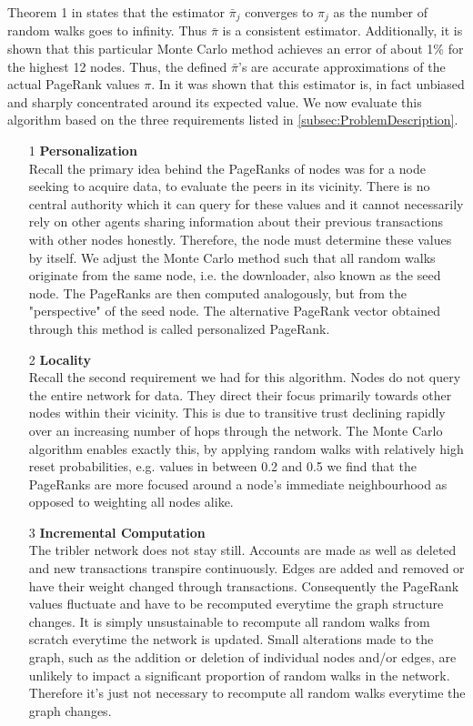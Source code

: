 \documentclass[sigconf]{acmart}
\theoremstyle{definition}
\begin{document}
\noindent Theorem 1 in \citep{Monte Carlo methods in PageRank computation: When one iteration is sufficient} states that the estimator $\bar{\pi}_j$ converges to $\pi_j$ as the number of random walks goes to infinity. Thus $\bar{\pi}$ is a consistent estimator. Additionally, it is shown that this particular Monte Carlo method achieves an error of about 1\% for the highest 12 nodes. Thus, the defined $\bar{\pi}$'s are accurate approximations of the actual PageRank values $\pi$. In \citep{Fast incremental and personalized pagerank} it was shown that this estimator is, in fact unbiased and sharply concentrated around its expected value. We now evaluate this algorithm based on the three requirements listed in \ref{subsec:ProblemDescription}.
\begin{itemize}
\item[1] {\bf Personalization} \\ Recall the primary idea behind the PageRanks of nodes was for a node seeking to acquire data, to evaluate the peers in its vicinity. There is no central authority which it can query for these values and it cannot necessarily rely on other agents sharing information about their previous transactions with other nodes honestly. Therefore, the node must determine these values by itself. We adjust the Monte Carlo method such that all random walks originate from the same node, i.e. the downloader, also known as the seed node. The PageRanks are then computed analogously, but from the "perspective" of the seed node. The alternative PageRank vector obtained through this method is called personalized PageRank.
\item[2] {\bf Locality} \\ Recall the second requirement we had for this algorithm. Nodes do not query the entire network for data. They direct their focus primarily towards other nodes within their vicinity. This is due to transitive trust declining rapidly over an increasing number of hops through the network. The Monte Carlo algorithm enables exactly this, by applying random walks with relatively high reset probabilities, e.g. values in between 0.2 and 0.5 we find that the PageRanks are more focused around a node's immediate neighbourhood as opposed to weighting all nodes alike.
\item[3] {\bf Incremental Computation}\\ The tribler network does not stay still. Accounts are made as well as deleted and new transactions transpire continuously. Edges are added and removed or have their weight changed through transactions. Consequently the PageRank values fluctuate and have to be recomputed everytime the graph structure changes. It is simply unsustainable to recompute all random walks from scratch everytime the network is updated. Small alterations made to the graph, such as the addition or deletion of individual nodes and/or edges, are unlikely to impact a significant proportion of random walks in the network. Therefore it's just not necessary to recompute all random walks everytime the graph changes. \vspace{1em}\\

\end{itemize}
\end{document}
